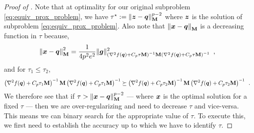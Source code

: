 \begin{proof}[Proof of ]
Note that at optimality for our original subproblem \eqref{eq:equiv_prox_problem}, we have $\tau^\star := \left\lVert \bm{z}-\bm{q} \right\rVert_{\mathbf{M}}^{p-2}$ where $\bm{z}$ is the solution of subproblem \eqref{eq:equiv_prox_problem}. Also note that $\left\lVert \bm{x}-\bm{q} \right\rVert_{\mathbf{M}}$ is a decreasing function in $\tau$ because,
\begin{align*}
    \left\lVert \bm{x}-\bm{q} \right\rVert_{\mathbf{M}}^2 = \frac{1}{4p^2e^2}\|\bm{g}\|^2_{\left(\nabla^2 f(\bm{q})+C_p\tau\mathbf{M}\right)^{-1}\mathbf{M}\left(\nabla^2 f(\bm{q})+C_p\tau\mathbf{M}\right)^{-1}}\enspace, 
\end{align*}
and for $\tau_1 \leq \tau_2$,
\begin{align*}
    \left(\nabla^2 f(\bm{q})+C_p\tau_1\mathbf{M}\right)^{-1}\mathbf{M}\left(\nabla^2 f(\bm{q})+C_p\tau_1\mathbf{M}\right)^{-1} \succeq \left(\nabla^2 f(\bm{q})+C_p\tau_2\mathbf{M}\right)^{-1}\mathbf{M}\left(\nabla^2 f(\bm{q})+C_p\tau_2\mathbf{M}\right)^{-1}\enspace.
\end{align*}
We therefore see that if $\tau > \left\lVert \bm{x}-\bm{q} \right\rVert_{\mathbf{M}}^{p-2}$ --- where $\bm{x}$ is the optimal solution for a fixed $\tau$ --- then we are over-regularizing and need to decrease $\tau$ and vice-versa. 
This means we can binary search for the appropriate value of $\tau$. To execute this, we first need to establish the accuracy up to which we have to identify $\tau$. 


\end{proof}

